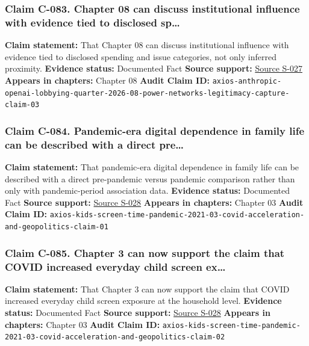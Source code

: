 \documentclass[
  american,
  11pt,
  letterpaper,
]{article}
\begin{document}
\subsubsection{Claim C-083. Chapter 08 can discuss institutional
influence with evidence tied to disclosed
sp\ldots{}}\label{claim-c-083-chapter-08-can-discuss-institutional-influence-with-evidence-tied-to-disclosed-sp}

\textbf{Claim statement:} That Chapter 08 can discuss institutional
influence with evidence tied to disclosed spending and issue categories,
not only inferred proximity. \textbf{Evidence status:} Documented Fact
\textbf{Source support:}
\hyperref[source-s-027-anthropic-outspends-openai-in-biggest-ever-lobbying-quarter]{Source
S-027} \textbf{Appears in chapters:} Chapter 08 \textbf{Audit Claim ID:}
\texttt{axios-anthropic-openai-lobbying-quarter-2026-08-power-networks-legitimacy-capture-claim-03}

\subsubsection{Claim C-084. Pandemic-era digital dependence in family
life can be described with a direct
pre\ldots{}}\label{claim-c-084-pandemic-era-digital-dependence-in-family-life-can-be-described-with-a-direct-pre}

\textbf{Claim statement:} That pandemic-era digital dependence in family
life can be described with a direct pre-pandemic versus pandemic
comparison rather than only with pandemic-period association data.
\textbf{Evidence status:} Documented Fact \textbf{Source support:}
\hyperref[source-s-028-kids-screen-time-up-50-during-pandemic]{Source
S-028} \textbf{Appears in chapters:} Chapter 03 \textbf{Audit Claim ID:}
\texttt{axios-kids-screen-time-pandemic-2021-03-covid-acceleration-and-geopolitics-claim-01}

\subsubsection{Claim C-085. Chapter 3 can now support the claim that
COVID increased everyday child screen
ex\ldots{}}\label{claim-c-085-chapter-3-can-now-support-the-claim-that-covid-increased-everyday-child-screen-ex}

\textbf{Claim statement:} That Chapter 3 can now support the claim that
COVID increased everyday child screen exposure at the household level.
\textbf{Evidence status:} Documented Fact \textbf{Source support:}
\hyperref[source-s-028-kids-screen-time-up-50-during-pandemic]{Source
S-028} \textbf{Appears in chapters:} Chapter 03 \textbf{Audit Claim ID:}
\texttt{axios-kids-screen-time-pandemic-2021-03-covid-acceleration-and-geopolitics-claim-02}
\end{document}
